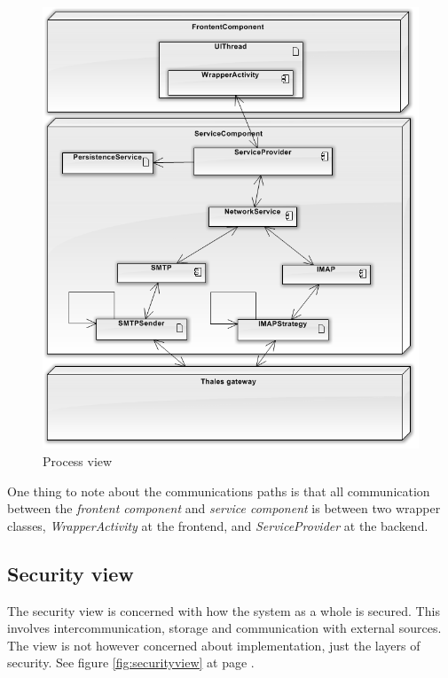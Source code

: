 \begin{figure}[H]
	\includegraphics[width=\textwidth]{processview.png}
	\caption{Process view}
	\label{fig:processview}
\end{figure}

One thing to note about the communications paths is that all communication between the \textit{frontent component} and \textit{service component} is between two wrapper classes, \textit{WrapperActivity} at the frontend, and \textit{ServiceProvider} at the backend. 

\subsection{Security view}
The security view is concerned with how the system as a whole is secured. This involves intercommunication, storage and communication with external sources. The view is not however concerned about implementation, just the layers of security.
See figure \ref{fig:securityview} at page \pageref{fig:securityview}.

